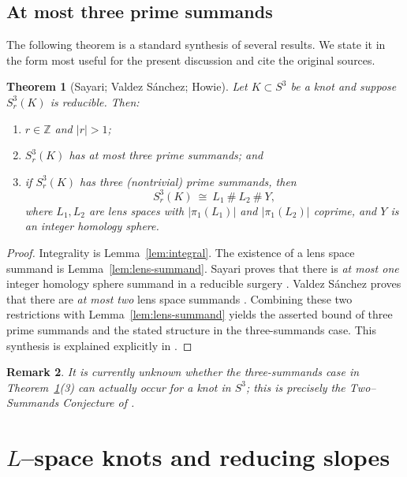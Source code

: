 \documentclass[11pt]{amsart}
\newtheorem{theorem}{Theorem}[section]
\newtheorem{remark}[theorem]{Remark}
\numberwithin{equation}{section}
\begin{document}
\subsection{At most three prime summands}

The following theorem is a standard synthesis of several results.  We state it in the form most useful for the
present discussion and cite the original sources.

\begin{theorem}[Sayari; Valdez S\'anchez; Howie]\label{thm:at-most-three}
Let $K\subset S^3$ be a knot and suppose $S^3_r(K)$ is reducible.  Then:
\begin{enumerate}
  \item $r\in\mathbb{Z}$ and $|r|>1$;
  \item $S^3_r(K)$ has at most three prime summands; and
  \item if $S^3_r(K)$ has three (nontrivial) prime summands, then
  \[
    S^3_r(K)\ \cong\ L_1\ \#\ L_2\ \#\ Y,
  \]
  where $L_1,L_2$ are lens spaces with $|\pi_1(L_1)|$ and $|\pi_1(L_2)|$ coprime, and $Y$ is an integer
  homology sphere.
\end{enumerate}
\end{theorem}

\begin{proof}
Integrality is Lemma~\ref{lem:integral}. The existence of a lens space summand is Lemma~\ref{lem:lens-summand}.
Sayari proves that there is \emph{at most one} integer homology sphere summand in a reducible surgery
\cite{Say98}.  Valdez S\'anchez proves that there are \emph{at most two} lens space summands
\cite{VS99}.  Combining these two restrictions with Lemma~\ref{lem:lens-summand} yields the asserted bound of
three prime summands and the stated structure in the three-summands case.  This synthesis is explained
explicitly in \cite[\S1]{How10}.
\end{proof}

\begin{remark}\label{rem:open}
It is currently unknown whether the three-summands case in Theorem~\ref{thm:at-most-three}(3) can actually occur
for a knot in $S^3$; this is precisely the Two--Summands Conjecture of \cite[Conjecture~1]{How10}.
\end{remark}

\section{$L$--space knots and reducing slopes}
\end{document}
